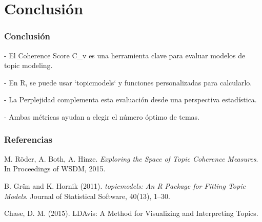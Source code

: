 \documentclass[10pt]{beamer}
\begin{document}
\section{Conclusión}
\begin{frame}
\frametitle{Conclusión}

    
- El Coherence Score C_v es una herramienta clave para evaluar modelos de topic modeling.
    
- En R, se puede usar `topicmodels` y funciones personalizadas para calcularlo.
    
- La Perplejidad complementa esta evaluación desde una perspectiva estadística.
    
- Ambas métricas ayudan a elegir el número óptimo de temas.

\end{frame}

\begin{frame}
\frametitle{Referencias}
\footnotesize
\begin{thebibliography}{9}
M. Röder, A. Both, A. Hinze.
\textit{Exploring the Space of Topic Coherence Measures}.
In Proceedings of WSDM, 2015.

B. Grün and K. Hornik (2011).
\textit{topicmodels: An R Package for Fitting Topic Models}.
Journal of Statistical Software, 40(13), 1–30.

Chase, D. M. (2015). LDAvis: A Method for Visualizing and Interpreting Topics.
\end{thebibliography}
\end{frame}
\end{document}
